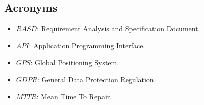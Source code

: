 \subsection{Acronyms}

\begin{itemize}
	\item $RASD$: Requirement Analysis and Specification Document.
	\item $API$: Application Programming Interface.
	\item $GPS$: Global Positioning System.
	\item $GDPR$: General Data Protection Regulation.
	\item $MTTR$: Mean Time To Repair.
\end{itemize}



 
 